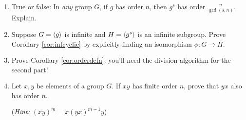 \begin{exercises}
\begin{enumerate}
	  
	  \item True or false: In \emph{any} group $G$, if $g$ has order $n$, then $g^s$ has order $\frac n{\gcd(s,n)}$. Explain.
	  
	  
	  \item Suppose $G=\left\langle g\right\rangle$ is infinite and $H=\left\langle g^s\right\rangle$ is an infinite subgroup. Prove Corollary \ref{cor:infcyclic} by explicitly finding an isomorphism $\phi:G\to H$.
	
	
	  \item Prove Corollary \ref{cor:orderdefn}: you'll need the division algorithm for the second part!
	  
	  
		\item Let $x,y$ be elements of a group $G$. If $xy$ has finite order $n$, prove that $yx$ also has order $n$.\par
		(\emph{Hint: $(xy)^m=x(yx)^{m-1}y$})
		
		
		
		

\end{enumerate}
\end{exercises}
